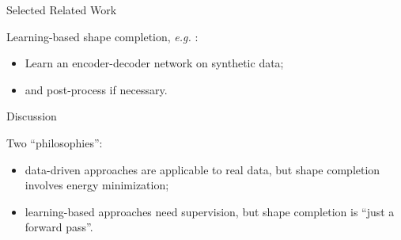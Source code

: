 \documentclass[22pt,table]{beamer}
\makeatletter
\newcommand*{\eg}{\emph{e.g.}\@\xspace}
\makeatother
\begin{document}
  \begin{frame}
    {\large Selected Related Work}
    
    Learning-based shape completion, \eg
    \cite{DaiNiessner:2016}:
    \begin{itemize}
      \item Learn an encoder-decoder network on synthetic data;
      \item and post-process if necessary.
    \end{itemize}
    
    \hspace*{0.5cm}
  \end{frame}
  
  \begin{frame}
    {\large Discussion}
    
    Two ``philosophies'':
    \begin{itemize}
      \item data-driven approaches are applicable to real data, but shape completion
      involves energy minimization;
      \item learning-based approaches need supervision, but shape completion
      is ``just a forward pass''.
    \end{itemize}
  \end{frame}
  
\end{document}
